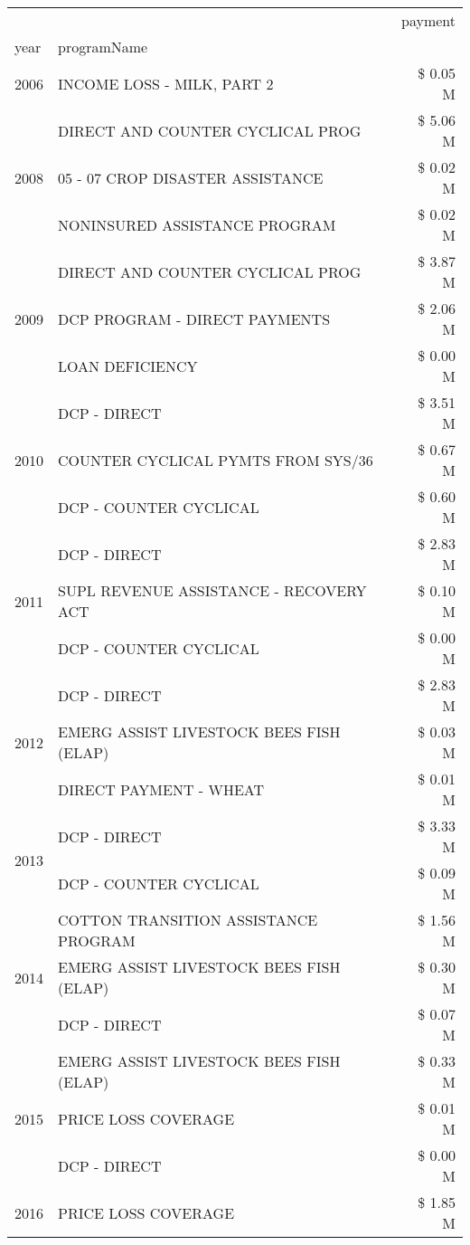 \begin{tabular}{llr}
\toprule
 &  & payment \\
year & programName &  \\
\midrule
2006 & INCOME LOSS - MILK, PART 2 & \$ 0.05 M \\
\cline{1-3}
\multirow[t]{3}{*}{2008} & DIRECT AND COUNTER CYCLICAL PROG & \$ 5.06 M \\
 & 05 - 07 CROP DISASTER ASSISTANCE & \$ 0.02 M \\
 & NONINSURED ASSISTANCE PROGRAM & \$ 0.02 M \\
\cline{1-3}
\multirow[t]{3}{*}{2009} & DIRECT AND COUNTER CYCLICAL PROG & \$ 3.87 M \\
 & DCP PROGRAM - DIRECT PAYMENTS & \$ 2.06 M \\
 & LOAN DEFICIENCY & \$ 0.00 M \\
\cline{1-3}
\multirow[t]{3}{*}{2010} & DCP - DIRECT & \$ 3.51 M \\
 & COUNTER CYCLICAL PYMTS FROM SYS/36 & \$ 0.67 M \\
 & DCP - COUNTER CYCLICAL & \$ 0.60 M \\
\cline{1-3}
\multirow[t]{3}{*}{2011} & DCP - DIRECT & \$ 2.83 M \\
 & SUPL REVENUE ASSISTANCE - RECOVERY ACT & \$ 0.10 M \\
 & DCP - COUNTER CYCLICAL & \$ 0.00 M \\
\cline{1-3}
\multirow[t]{3}{*}{2012} & DCP - DIRECT & \$ 2.83 M \\
 & EMERG ASSIST LIVESTOCK BEES FISH (ELAP) & \$ 0.03 M \\
 & DIRECT PAYMENT - WHEAT & \$ 0.01 M \\
\cline{1-3}
\multirow[t]{2}{*}{2013} & DCP - DIRECT & \$ 3.33 M \\
 & DCP - COUNTER CYCLICAL & \$ 0.09 M \\
\cline{1-3}
\multirow[t]{3}{*}{2014} & COTTON TRANSITION ASSISTANCE PROGRAM & \$ 1.56 M \\
 & EMERG ASSIST LIVESTOCK BEES FISH (ELAP) & \$ 0.30 M \\
 & DCP - DIRECT & \$ 0.07 M \\
\cline{1-3}
\multirow[t]{3}{*}{2015} & EMERG ASSIST LIVESTOCK BEES FISH (ELAP) & \$ 0.33 M \\
 & PRICE LOSS COVERAGE & \$ 0.01 M \\
 & DCP - DIRECT & \$ 0.00 M \\
\cline{1-3}
\multirow[t]{3}{*}{2016} & PRICE LOSS COVERAGE & \$ 1.85 M \\

\end{tabular}
